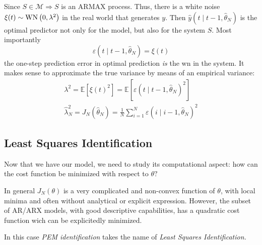 Since $ S\in \mathcal{M} \Longrightarrow S$ is an ARMAX process. Thus, there is a white noise $ \xi (t) \sim \operatorname{WN}\left(0,\lambda ^{2}\right)$ in the real world that generates $y$. Then $ \hat{y}(t\mid t-1,\hat{\theta }_{N})$ is the optimal predictor not only for the model, but also for the system $S$. Most importantly
\begin{equation*}
\varepsilon (t\mid t-1,\hat{\theta }_{N}) =\xi (t)
\end{equation*}
the one-step prediction error in optimal prediction \textit{is} the \gls{wn} in the system. It makes sense to approximate the true variance by means of an empirical variance:
\begin{gather*}
\lambda ^{2} =\mathbb{E}\left[ \xi (t)^{2}\right] =\mathbb{E}[ \varepsilon (t\mid t-1,\hat{\theta }_{N})^2]\\
\hat{\lambda }_{N}^{2} =J_{N}(\hat{\theta }_{N}) =\frac{1}{N}\sum _{i=1}^{N} \varepsilon (i\mid i-1,\hat{\theta }_{N})^{2}
\end{gather*}

\subsection{Least Squares Identification}
Now that we have our model, we need to study its computational aspect: how can the cost function be minimized with respect to $ \theta ?$

In general $ J_{N}(\theta)$ is a very complicated and non-convex function of $ \theta $, with local minima and often without analytical or explicit expression. However, the subset of AR/ARX models, with good descriptive capabilities, has a quadratic cost function wich can be explicitedly minimized.

In this case \textit{PEM identification} takes the name of \textit{Least Squares Identification.}

